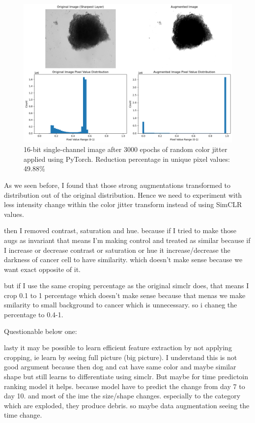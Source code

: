   \begin{figure}[H]
    \centering
    \includegraphics[scale=0.5]{figures/16bit_onen.png} 
    \caption{16-bit single-channel image after 3000 epochs of random color jitter applied using PyTorch. Reduction percentage in unique pixel values: 49.88\%}
    \label{fig:16bit_single_channel}
  \end{figure}

As we seen before, I found that those strong augmentations transformed to distribution out of 
the original distribution. Hence we need to experiment with less intensity change  within the color 
jitter transform instead of using SimCLR values.



then I removed contrast, saturation and hue. because if I tried to make 
those augs as invariant that means I'm making control and treated as 
similar because if I increase or decrease contrast or 
saturation or hue it increase/decrease the darkness of cancer cell to 
have similarity.
which doesn't make sense because we want exact opposite of it.

but if I use the same croping percentage as the original simclr does, 
that means I crop 0.1  to 1 percentage which doesn't make sense because that 
menas we make smilarity to small background to cancer which is unnecessary. 
so i chaneg the percentage to 0.4-1.

Questionable below one:

lasty it may be possible to learn efficient feature extraction by not 
applying cropping, ie learn by seeing full picture (big picture). 
I understand this is not good argument because then dog and cat have same 
color and maybe similar shape but still learns to differentiate using simclr.
But maybe for time predictoin ranking model it helps. because model have to 
predict the change from day 7 to day 10. and most of the ime the size/shape
 changes. especially to the category which are exploded, they produce debris. 
 so maybe data augmentation seeing the time change. 

